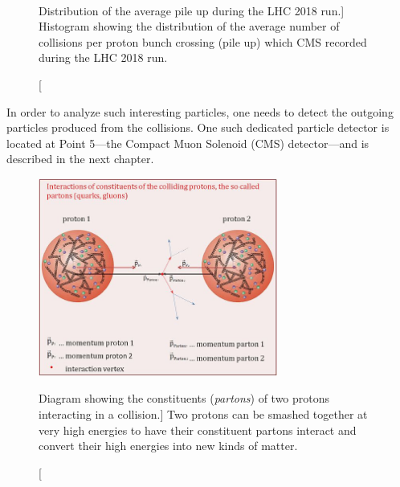 $$\begin{figure}[h]
        \caption
            [Distribution of the average pile up during the LHC 2018 run.]
            {Histogram showing the distribution of the average number of \pp collisions per proton bunch crossing (pile up) which CMS recorded during the LHC 2018 run.} 
        \label{plt:pileup}
    \end{figure}
In order to analyze such interesting particles, one needs to detect the outgoing particles produced from the \pp collisions.
One such dedicated particle detector is located at Point 5---the Compact Muon Solenoid (CMS) detector---and is described in the next chapter.
\begin{figure}[h]
    \centering
    \includegraphics[width=0.7\textwidth,keepaspectratio]{figures/lhc/proton_proton_quarksandgluons.jpg}
        \caption
            [Diagram showing the constituents (\emph{partons}) of two protons interacting in a \pp collision.]
            {Two protons can be smashed together at very high energies to have their constituent partons interact and convert their high energies into new kinds of matter.} 
        \label{fig:pp_collision}
    \end{figure}






